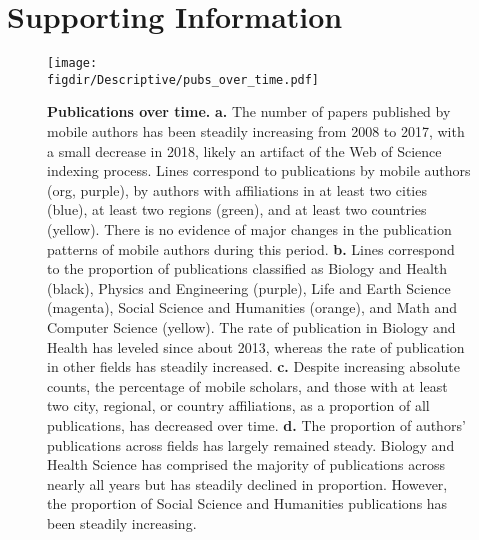\documentclass[12pt]{article} %
\def\figdir{../Figs}
\newcommand{\beginsupplement}{%
        \setcounter{table}{0}
        \renewcommand{\thetable}{S\arabic{table}}%
        \setcounter{figure}{0}
        \renewcommand{\thefigure}{S\arabic{figure}}%
     }
\begin{document}
\newpage
\clearpage
\beginsupplement
\section{Supporting Information}



%
%
\begin{figure}[p!]
    \centering
    \label{fig:supp:pubs_over_time}
    \texttt{[image: \\figdir/Descriptive/pubs\_over\_time.pdf]}
    \caption{
        \textbf{Publications over time.}
        \textbf{a.}
        The number of papers published by mobile authors has been steadily increasing from 2008 to 2017, with a small decrease in 2018,  likely an artifact of the Web of Science indexing process.
        Lines correspond to publications by mobile authors (org, purple), by authors with affiliations in at least two cities (blue), at least two regions (green), and at least two countries (yellow).
        There is no evidence of major changes in the publication patterns of mobile authors during this period.
        \textbf{b.}
        Lines correspond to the proportion of publications classified as Biology and Health (black), Physics and Engineering (purple), Life and Earth Science (magenta), Social Science and Humanities (orange), and Math and Computer Science (yellow).
        The rate of publication in Biology and Health has leveled since about 2013, whereas the rate of publication in other fields has steadily increased.
        \textbf{c.}
        Despite increasing absolute counts, the percentage of mobile scholars, and those with at least two city, regional, or country affiliations, as a proportion of all publications, has decreased over time.
        \textbf{d.}
        The proportion of authors' publications across fields has largely remained steady.
        Biology and Health Science has comprised the majority of publications across nearly all years but has steadily declined in proportion.
        However, the proportion of Social Science and Humanities publications has been steadily increasing.
    }
\end{figure}
\end{document}
